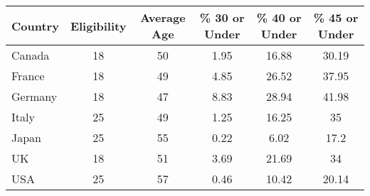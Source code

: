 \begin{tabular}{lccccc}
\toprule
Country & Eligibility & Average Age & \% 30 or Under & \% 40 or Under & \% 45 or Under \\ 
\midrule
Canada & 18 & 50 & 1.95 & 16.88 & 30.19 \\ 
France & 18 & 49 & 4.85 & 26.52 & 37.95 \\ 
Germany & 18 & 47 & 8.83 & 28.94 & 41.98 \\ 
Italy & 25 & 49 & 1.25 & 16.25 & 35 \\ 
Japan & 25 & 55 & 0.22 & 6.02 & 17.2 \\ 
UK & 18 & 51 & 3.69 & 21.69 & 34 \\ 
USA & 25 & 57 & 0.46 & 10.42 & 20.14 \\ 
\bottomrule
\end{tabular}
